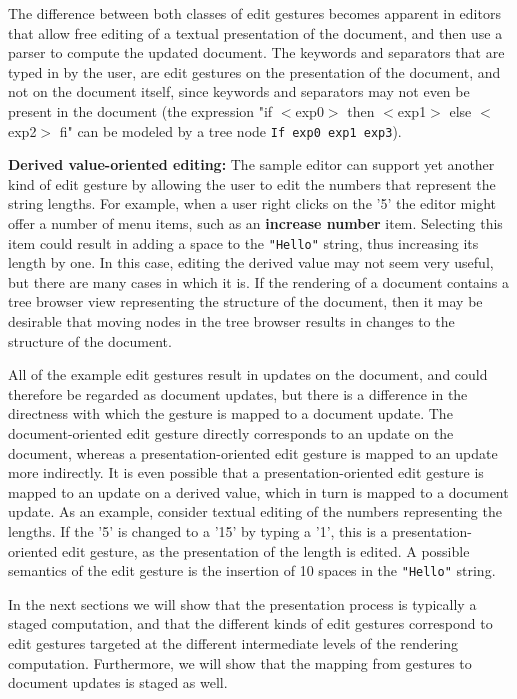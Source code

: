 \documentclass[twoside,epsf]{report}
\begin{document}
The difference between both classes of edit gestures becomes apparent in editors that allow free editing of a textual presentation of the document, and then use a parser to compute the updated document. The keywords and separators that are typed in by the user, are edit gestures on the presentation of the document, and not on the document itself, since keywords and separators may not even be present in the document (the expression "if $<$exp0$>$ then $<$exp1$>$ else $<$exp2$>$ fi" can be modeled by a tree node \texttt{If exp0 exp1 exp3}).

{\bf Derived value-oriented editing: }The sample editor can support yet another kind of edit gesture by allowing the user to edit the numbers that represent the string lengths. For example, when a user right clicks on the '5' the editor might offer a number of menu items, such as an {\bf increase number} item. Selecting this item could result in adding a space to the \texttt{"Hello"} string, thus increasing its length by one. In this case, editing the derived value may not seem very useful, but there are many cases in which it is. If the rendering of a document contains a tree browser view representing the structure of the document, then it may be desirable that moving nodes in the tree browser results in changes to the structure of the document.

\bigskip All of the example edit gestures result in updates on the document, and could therefore be regarded as document updates, but there is a difference in the directness with which the gesture is mapped to a document update. The document-oriented edit gesture directly corresponds to an update on the document, whereas a presentation-oriented edit gesture is mapped to an update more indirectly. It is even possible that a presentation-oriented edit gesture is mapped to an update on a derived value, which in turn is mapped to a document update. As an example, consider textual editing of the numbers representing the lengths. If the '5' is changed to a '15' by typing a '1', this is a presentation-oriented edit gesture, as the presentation of the length is edited. A possible semantics of the edit gesture is the insertion of 10 spaces in the \texttt{"Hello"} string.

In the next sections we will show that the presentation process is typically a staged computation, and that the different kinds of edit gestures correspond to edit gestures targeted at the different intermediate levels of the rendering computation. Furthermore, we will show that the mapping from gestures to document updates is staged as well. 
\end{document}
